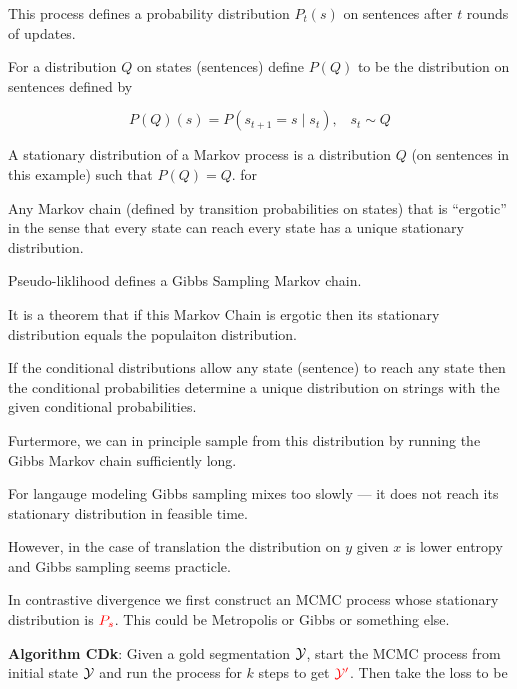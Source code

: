 {\vfill
This process defines a probability distribution $P_t(s)$ on sentences after $t$ rounds of updates.

For a distribution $Q$ on states (sentences) define $P(Q)$ to be the distribution on sentences defined by

\vfill
$$P(Q)(s) = P(s_{t+1} = s\;|\;s_t),\;\;\;s_t \sim Q$$

\vfill
A stationary distribution of a Markov process is a distribution $Q$ (on sentences in this example) such that $P(Q) = Q$.
for

\vfill
Any Markov chain (defined by transition probabilities on states) that is ``ergotic'' in the sense that every state can reach every state has a unique stationary distribution.


Pseudo-liklihood defines a Gibbs Sampling Markov chain.

\vfill
It is a theorem that if this Markov Chain is ergotic then its stationary distribution equals the populaiton distribution.


If the conditional distributions allow any state (sentence) to reach any state then the conditional probabilities determine a unique distribution on
strings with the given conditional probabilities.

\vfill
Furtermore, we can in principle sample from this distribution by running the Gibbs Markov chain sufficiently long.


For langauge modeling Gibbs sampling mixes too slowly --- it does not reach its stationary distribution in feasible time.

\vfill
However, in the case of translation the distribution on $y$ given $x$ is lower entropy and Gibbs sampling seems practicle.

}




In contrastive divergence we first construct an MCMC process whose stationary distribution is ${\color{red} P_s}$.  This could be
Metropolis or Gibbs or something else.

\vfill
{\bf Algorithm CDk}: Given a gold segmentation ${\cal Y}$, start the MCMC process from initial state ${\cal Y}$ and run the process for $k$ steps
to get ${\color{red} {\cal Y}'}$.  Then take the loss to be

